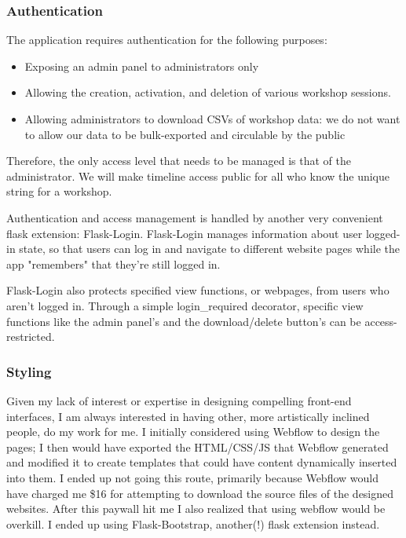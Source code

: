 \documentclass[12pt] {article}
\begin{document}
\subsubsection{Authentication}

The application requires authentication for the following purposes: 
\begin{itemize}
    \item Exposing an admin panel to administrators only
    \item Allowing the creation, activation, and deletion of various workshop sessions. 
    \item Allowing administrators to download CSVs of workshop data: we do not want to allow our data to be bulk-exported and circulable by the public
\end{itemize}

Therefore, the only access level that needs to be managed is that of the administrator. We will make timeline access public for all who know the unique string for a workshop.

Authentication and access management is handled by another very convenient flask extension: Flask-Login. Flask-Login manages information about user logged-in state, so that users can log in and navigate to different website pages while the app "remembers" that they're still logged in. 

Flask-Login also protects specified view functions, or webpages, from users who aren't logged in. Through a simple login\_required decorator, specific view functions like the admin panel's and the download/delete button's can be access-restricted.


\subsubsection{Styling}
Given my lack of interest or expertise in designing compelling front-end interfaces, I am always interested in having other, more artistically inclined people, do my work for me. I initially considered using Webflow to design the pages; I then would have exported the HTML/CSS/JS that Webflow generated and modified it to create templates that could have content dynamically inserted into them. I ended up not going this route, primarily because Webflow would have charged me \$16 for attempting to download the source files of the designed websites. After this paywall hit me I also realized that using webflow would be overkill. I ended up using Flask-Bootstrap, another(!) flask extension instead.
\end{document}
